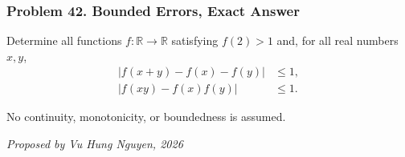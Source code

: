 \subsubsection*{Problem 42. Bounded Errors, Exact Answer}

\begin{exercisebox}[medium]

Determine all functions $f:\mathbb R\to\mathbb R$ satisfying $f(2)>1$ and, for all real numbers $x,y$,
\[
\boxed{
\begin{aligned}
\bigl|f(x+y)-f(x)-f(y)\bigr|&\le1,\\
\bigl|f(xy)-f(x)f(y)\bigr|&\le1.
\end{aligned}}
\]

No continuity, monotonicity, or boundedness is assumed.

\begin{flushright}
\textit{Proposed by Vu Hung Nguyen, 2026}
\end{flushright}


\end{exercisebox}

